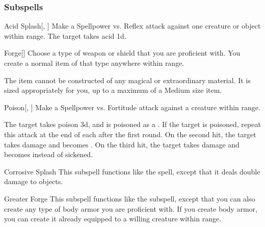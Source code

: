 \subsubsection{Subspells}


\begin{ability}[\nth{1}]{Acid Splash}[, ]
Make a Spellpower vs. Reflex attack against one creature or object within \rngmed range.
\hit The target takes acid  \plus1d.
\end{ability}
\vspace{0.25em}


\begin{ability}[\nth{1}]{Forge}[]
Choose a type of weapon or shield that you are proficient with.
You create a normal item of that type anywhere within \rngclose range.

The item cannot be constructed of any magical or extraordinary material.
It is sized appropriately for you, up to a maximum of a Medium size item.
\end{ability}
\vspace{0.25em}


\begin{ability}[\nth{2}]{Poison}[, ]
Make a Spellpower vs. Fortitude attack against a creature within \rngmed range.

\hit The target takes poison  \minus3d, and is poisoned as a .
If the target is poisoned, repeat this attack at the end of each  after the first round.
On the second hit, the target takes damage and becomes .
On the third hit, the target takes damage and becomes  instead of sickened.
\end{ability}
\vspace{0.25em}


\begin{ability}[\nth{3}]{Corrosive Splash}
This subspell functions like the  spell, except that it deals double damage to objects.
\end{ability}
\vspace{0.25em}


\begin{ability}[\nth{3}]{Greater Forge}
This subspell functions like the  subspell, except that you can also create any type of body armor you are proficient with.
If you create body armor, you can create it already equipped to a willing creature within range.
\end{ability}
\vspace{0.25em}


